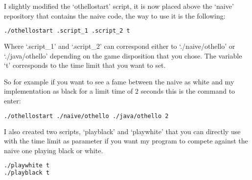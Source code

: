 I slightly modified the `othellostart' script, it is now placed above the `naive' repository that contains the naive code, the way to use it is the following:

\begin{lstlisting}[language=bash]
./othellostart .script_1 .script_2 t
\end{lstlisting}

Where `.script\_1' and `.script\_2' can correspond either to `./naive/othello' or `./java/othello' depending on the game disposition that you chose.
The variable `t' corresponds to the time limit that you want to set.

So for example if you want to see a fame between the naive as white and my implementation as black for a limit time of 2 seconds this is the command to enter:

\begin{lstlisting}[language=bash]
./othellostart ./naive/othello ./java/othello 2
\end{lstlisting}

I also created two scripts, `playblack' and `playwhite' that you can directly use with the time limit as parameter if you want my program to compete against the naive one playing black or white.

\begin{lstlisting}[language=bash]
./playwhite t
./playblack t
\end{lstlisting}
